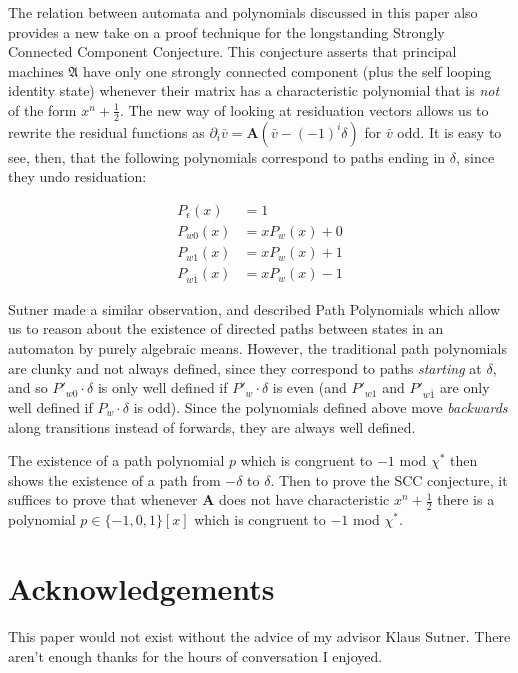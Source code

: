 \documentclass[final]{ws-ijac}
\renewcommand{\P}{\mathfrak{A}}
\newcommand{\2}{\textbf{2}}
\newcommand{\Am}{\textbf{A}}
\newcommand{\del}{\partial}
\newcommand{\vv}{\bar{v}}
\begin{document}
The relation between automata and polynomials discussed in this paper 
also provides a new take on a proof technique for the longstanding
Strongly Connected Component Conjecture. This conjecture 
asserts that principal machines $\P$ have only one strongly connected component 
(plus the self looping identity state) whenever their matrix has a 
characteristic polynomial that is \emph{not} of the form $x^n + \frac{1}{2}$.
The new way of looking at residuation vectors allows us to rewrite the 
residual functions as $\del_i \vv = \Am (\vv - (-1)^i \delta)$ for $\vv$ odd.
It is easy to see, then, that the following polynomials correspond to paths
ending in $\delta$, since they undo residuation:

\begin{align*}
  P_\epsilon(x)   &= 1\\
  P_{w0}(x)       &= xP_w(x) + 0\\
  P_{w1}(x)       &= xP_w(x) + 1\\
  P_{w\bar{1}}(x) &= xP_w(x) - 1
\end{align*}

Sutner made a similar observation, and described Path Polynomials 
\cite{Sutner18:abelian_automata} which
allow us to reason about the existence of directed paths between states 
in an automaton by purely algebraic means. However, the traditional path 
polynomials are clunky and not always defined, since they correspond to paths
\emph{starting} at $\delta$, and so $P'_{w0} \cdot \delta$ is only well 
defined if $P'_w \cdot \delta$ is even (and $P'_{w1}$ and $P'_{w\bar{1}}$ 
are only well defined if $P_w \cdot \delta$ is odd). Since the polynomials 
defined above move \emph{backwards} along transitions instead of forwards, 
they are always well defined.

The existence of a path polynomial $p$ which is congruent to $-1$ mod $\chi^*$
then shows the existence of a path from $-\delta$ to $\delta$.
Then to prove the SCC conjecture, it suffices to prove that whenever $\Am$ 
does not have characteristic $x^n + \frac{1}{2}$ there is a polynomial 
$p \in \{-1,0,1\}[x]$ which is congruent to $-1$ mod $\chi^*$. 

\section*{Acknowledgements}
This paper would not exist without the advice of my advisor Klaus Sutner.
There aren't enough thanks for the hours of conversation I enjoyed.

\newpage



\end{document}
